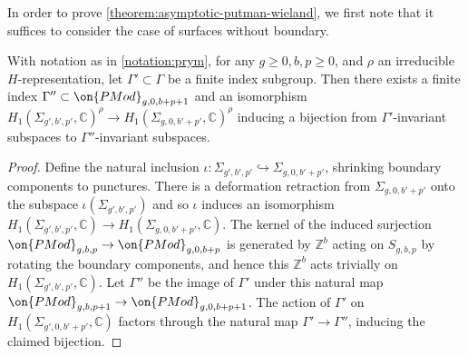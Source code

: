 In order to prove \autoref{theorem:asymptotic-putman-wieland},
we first note that it suffices to consider the case of surfaces without boundary.
\begin{lemma}
\notready
	\label{lemma:ignore-boundary}
	With notation as in \autoref{notation:prym},
	for any $g \geq 0, b, p \geq 0$,
	and $\rho$ an irreducible $H$-representation, let $\Gamma'\subset
	\Gamma$ be a finite index subgroup. Then there exists a finite index
	$\Gamma''\subset \on{PMod}_{g,0,b+p+1}$ and
 an isomorphism
$H_1(\Sigma_{g',b',p'}, \mathbb C)^\rho \to H_1(\Sigma_{g,0,b'+p'}, \mathbb
C)^\rho$
inducing a bijection from $\Gamma'$-invariant subspaces to
$\Gamma''$-invariant subspaces.
\end{lemma}
\begin{proof}
%
Define the natural inclusion $\iota: \Sigma_{g',b',p'} \hookrightarrow
\Sigma_{g,0,b'+p'}$,
shrinking boundary components to punctures.
There is a deformation retraction from $\Sigma_{g,0,b'+p'}$ onto the subspace
$\iota(\Sigma_{g',b',p'})$
and so $\iota$ induces an isomorphism
$H_1(\Sigma_{g',b',p'}, \mathbb C) \to H_1(\Sigma_{g,0,b'+p'}, \mathbb C).$
The kernel of the induced surjection $\on{PMod}_{g, b,p} \to \on{PMod}_{g,0,b+p}$
is generated by $\mathbb Z^b$ acting on $S_{g,b,p}$ by rotating the
boundary components,
\cite[Theorem 3.18]{farbM:a-primer}
and hence this $\mathbb Z^b$ acts trivially on
$H_1(\Sigma_{g',b',p'}, \mathbb C)$.
Let $\Gamma''$ be the image of $\Gamma'$ under this natural map $\on{PMod}_{g,
b,p+1} \to \on{PMod}_{g,0,b+p+1}$.
The action of $\Gamma'$ on
$H_1(\Sigma_{g',0,b'+p'}, \mathbb{C})$ factors through the natural map $\Gamma'\to \Gamma''$, inducing the claimed bijection.
\end{proof}
